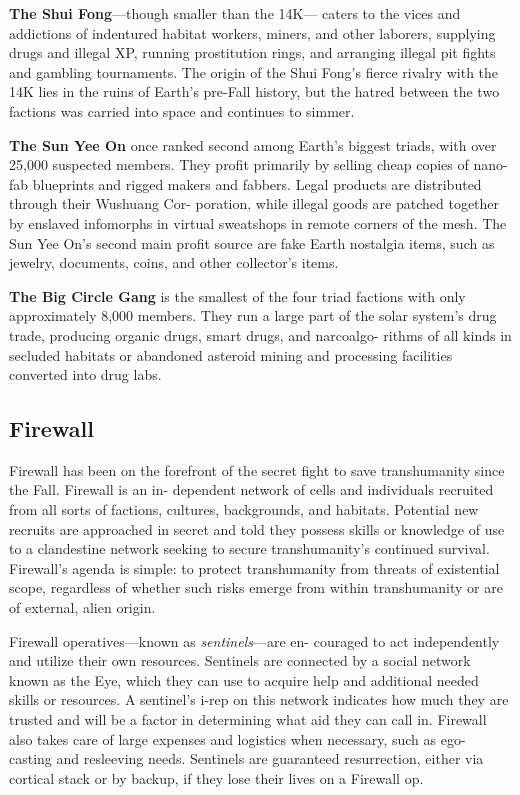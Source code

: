 \textbf{The Shui Fong}—though smaller than the 14K—
caters to the vices and addictions of indentured 
habitat workers, miners, and other laborers, supplying 
drugs and illegal XP, running prostitution rings, and 
arranging illegal pit fights and gambling tournaments. 
The origin of the Shui Fong's fierce rivalry with the 
14K lies in the ruins of Earth's pre-Fall history, but 
the hatred between the two factions was carried into 
space and continues to simmer.

\textbf{The Sun Yee On} once ranked second among Earth's 
biggest triads, with over 25,000 suspected members. 
They profit primarily by selling cheap copies of nano-
fab blueprints and rigged makers and fabbers. Legal 
products are distributed through their Wushuang Cor-
poration, while illegal goods are patched together by 
enslaved infomorphs in virtual sweatshops in remote 
corners of the mesh. The Sun Yee On's second main 
profit source are fake Earth nostalgia items, such as 
jewelry, documents, coins, and other collector's items.

\textbf{The Big Circle Gang} is the smallest of the four triad 
factions with only approximately 8,000 members. 
They run a large part of the solar system's drug trade, 
producing organic drugs, smart drugs, and narcoalgo-
rithms of all kinds in secluded habitats or abandoned 
asteroid mining and processing facilities converted 
into drug labs.

\subsection{Firewall}

Firewall has been on the forefront of the secret fight 
to save transhumanity since the Fall. Firewall is an in-
dependent network of cells and individuals recruited 
from all sorts of factions, cultures, backgrounds, 
and habitats. Potential new recruits are approached 
in secret and told they possess skills or knowledge 
of use to a clandestine network seeking to secure 
transhumanity's continued survival. Firewall's agenda 
is simple: to protect transhumanity from threats of 
existential scope, regardless of whether such risks 
emerge from within transhumanity or are of external, 
alien origin.

Firewall operatives—known as \textit{sentinels}—are en-
couraged to act independently and utilize their own 
resources. Sentinels are connected by a social network 
known as the Eye, which they can use to acquire help 
and additional needed skills or resources. A sentinel's 
i-rep on this network indicates how much they are 
trusted and will be a factor in determining what 
aid they can call in. Firewall also takes care of large 
expenses and logistics when necessary, such as ego-
casting and resleeving needs. Sentinels are guaranteed 
resurrection, either via cortical stack or by backup, if 
they lose their lives on a Firewall op.

